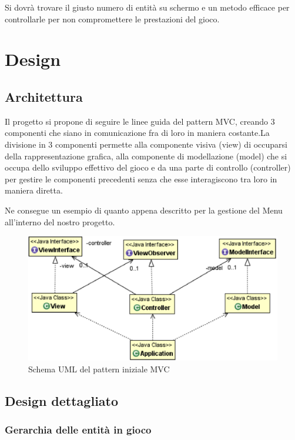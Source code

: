 \documentclass[a4paper,12pt]{report}
\begin{document}
 
Si dovrà trovare il giusto numero di entità su schermo e un metodo efficace per controllarle per non compromettere le prestazioni del gioco.
 


\chapter{Design}
\section{Architettura}

Il progetto si propone di seguire le linee guida del pattern MVC, creando 3 componenti che siano in comunicazione fra di loro in maniera costante.La divisione in 3 componenti permette alla componente visiva (view) di occuparsi della rappresentazione grafica, alla componente di modellazione (model) che si occupa dello sviluppo effettivo del gioco e da una parte di controllo (controller) per gestire le componenti precedenti senza che esse interagiscono tra loro in maniera diretta. 

Ne consegue un esempio di quanto appena descritto per la gestione del Menu all'interno del nostro progetto.

\begin{figure}[H]
	\centering{}
	\includegraphics[scale=0.4]{img/mvc.png}
	\caption{Schema UML del pattern iniziale MVC}
	\label{img:tickingObjectTree}
\end{figure}


\section{Design dettagliato}

\subsection*{Gerarchia delle entità in gioco}
\end{document}
